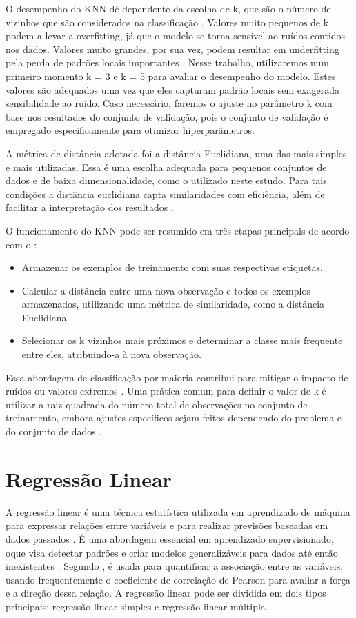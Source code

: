 O desempenho do KNN dé dependente da escolha de k, que são o número de vizinhos que são considerados na classificação \cite{zhang2016}. Valores muito pequenos de k podem a levar a overfitting, já que o modelo se torna sensível ao ruídos contidos nos dados. Valores muito grandes, por sua vez, podem resultar em underfitting pela perda de padrões locais importantes \cite{elkan2011}. Nesse trabalho, utilizaremos num primeiro momento k = 3 e k = 5 para avaliar o desempenho do modelo. Estes valores são adequados uma vez que eles capturam padrão locais sem exagerada sensibilidade ao ruído. Caso necessário, faremos o ajuste no parâmetro k com base nos resultados do conjunto de validação, pois o conjunto de validação é empregado especificamente para otimizar hiperparâmetros.

A métrica de distância adotada foi a distância Euclidiana, uma das mais simples e mais utilizadas. Essa é uma escolha adequada para pequenos conjuntos de dados e de baixa dimensionalidade, como o utilizado neste estudo. Para tais condições a distância euclidiana capta similaridades com eficiência, além de facilitar a interpretação dos resultados \cite{elkan2011}.

O funcionamento do KNN pode ser resumido em três etapas principais de acordo com o :
\begin{itemize}
    \item Armazenar os exemplos de treinamento com suas respectivas etiquetas.
    \item Calcular a distância entre uma nova observação e todos os exemplos armazenados, utilizando uma métrica de similaridade, como a distância Euclidiana.
    \item Selecionar os k vizinhos mais próximos e determinar a classe mais frequente entre eles, atribuindo-a à nova observação.
\end{itemize}

Essa abordagem de classificação por maioria contribui para mitigar o impacto de ruídos ou valores extremos \cite{elkan2011}. Uma prática comum para definir o valor de k é utilizar a raiz quadrada do número total de observações no conjunto de treinamento, embora ajustes específicos sejam feitos dependendo do problema e do conjunto de dados \cite{elkan2011}.

\section{Regressão Linear}
A regressão linear é uma técnica estatística utilizada em aprendizado de máquina para expressar relações entre variáveis e para realizar previsões baseadas em dados passados \cite{rodrigues}. É uma abordagem essencial em aprendizado supervisionado, oque visa detectar padrões e criar modelos generalizáveis para dados até então inexistentes \cite{soto}. Segundo ,  é usada para quantificar a associação entre as variáveis, usando frequentemente o coeficiente de correlação de Pearson para avaliar a força e a direção dessa relação. A regressão linear pode ser dividida em dois tipos principais: regressão linear simples e regressão linear múltipla \cite{soto}.

